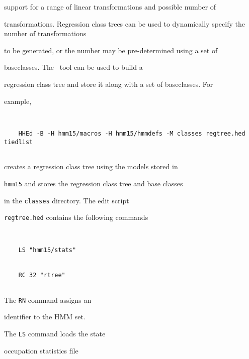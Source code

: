 support for a range of linear transformations and possible number of


transformations. Regression class trees can be used to dynamically specify the number of transformations


to be generated, or the number may be pre-determined using a set of


baseclasses. The \HTK\ tool  can be used to build a


regression class tree and store it along with a set of baseclasses. For


example,





\begin{verbatim}


    HHEd -B -H hmm15/macros -H hmm15/hmmdefs -M classes regtree.hed tiedlist


\end{verbatim}





\noindent


creates a regression class tree using the models stored in


\texttt{hmm15} and stores the regression class tree and base classes


in the \texttt{classes} directory.  The  edit script


\texttt{regtree.hed} contains the following commands





\begin{verbatim}


    LS "hmm15/stats"


    RC 32 "rtree"


\end{verbatim}








\noindent


The \texttt{RN} command assigns an


identifier to the HMM set.


The \texttt{LS} command loads the state 


occupation statistics file 


